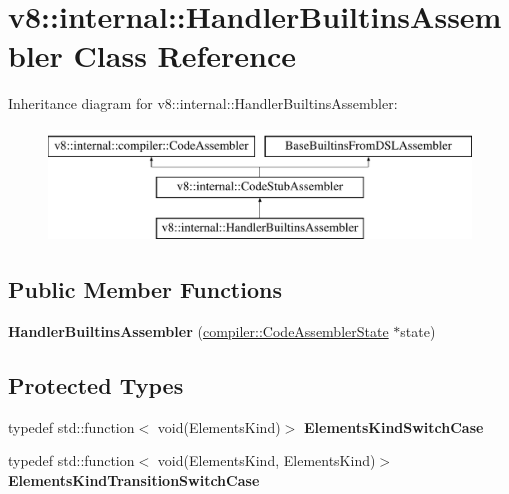 \hypertarget{classv8_1_1internal_1_1HandlerBuiltinsAssembler}{}\section{v8\+:\+:internal\+:\+:Handler\+Builtins\+Assembler Class Reference}
\label{classv8_1_1internal_1_1HandlerBuiltinsAssembler}
Inheritance diagram for v8\+:\+:internal\+:\+:Handler\+Builtins\+Assembler\+:\begin{figure}[H]
\begin{center}
\leavevmode
\includegraphics[height=3.000000cm]{classv8_1_1internal_1_1HandlerBuiltinsAssembler}
\end{center}
\end{figure}
\subsection*{Public Member Functions}
\begin{DoxyCompactItemize}
\item 
\mbox{\label{classv8_1_1internal_1_1HandlerBuiltinsAssembler_ab0d93c89650b8eb33eab5d240f83d4fd}} 
{\bfseries Handler\+Builtins\+Assembler} (\mbox{\hyperlink{classv8_1_1internal_1_1compiler_1_1CodeAssemblerState}{compiler\+::\+Code\+Assembler\+State}} $\ast$state)
\end{DoxyCompactItemize}
\subsection*{Protected Types}
\begin{DoxyCompactItemize}
\item 
\mbox{\label{classv8_1_1internal_1_1HandlerBuiltinsAssembler_a1fa6d50914e95a10d403a621cf152889}} 
typedef std\+::function$<$ void(Elements\+Kind)$>$ {\bfseries Elements\+Kind\+Switch\+Case}
\item 
\mbox{\label{classv8_1_1internal_1_1HandlerBuiltinsAssembler_ae867a3b0a88b3f802b3578c8a5566017}} 
typedef std\+::function$<$ void(Elements\+Kind, Elements\+Kind)$>$ {\bfseries Elements\+Kind\+Transition\+Switch\+Case}
\end{DoxyCompactItemize}
